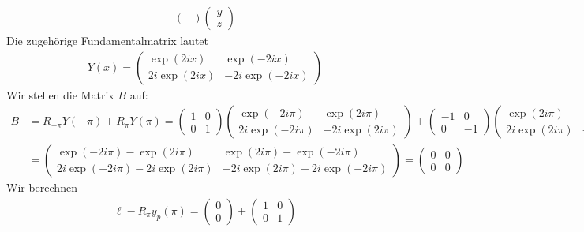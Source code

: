 \begin{solution}
\begin{enumerate}[label = \textbf{\alph*)}]
\begin{align*}
\begin{pmatrix}
    \end{pmatrix}
    \begin{pmatrix}
      y \\ z
    \end{pmatrix}
  \end{align*}
  Die zugehörige Fundamentalmatrix lautet
  \begin{align*}
    Y(x) = \begin{pmatrix}
      \exp(2ix) & \exp(-2ix) \\ 2i\exp(2ix) & -2i\exp(-2ix)
    \end{pmatrix}
  \end{align*}
  Wir stellen die Matrix $B$ auf:
  \begin{align*}
    B &= R_{-\pi}Y(-\pi) + R_{\pi}Y(\pi) =
    \begin{pmatrix}
      1 & 0 \\ 0 & 1
    \end{pmatrix}
    \begin{pmatrix}
      \exp(-2i\pi) & \exp(2i\pi) \\ 2i\exp(-2i\pi) & -2i\exp(2i\pi)
    \end{pmatrix} +
    \begin{pmatrix}
      -1 & 0 \\ 0 & -1
    \end{pmatrix}
    \begin{pmatrix}
      \exp(2i\pi) & \exp(-2i\pi) \\ 2i\exp(2i\pi) & -2i\exp(-2i\pi)
    \end{pmatrix} \\
    &= \begin{pmatrix}
      \exp(-2i\pi) - \exp(2i\pi) & \exp(2i\pi) - \exp(-2i\pi) \\
      2i\exp(-2i\pi) - 2i\exp(2i\pi) & -2i\exp(2i\pi) + 2i\exp(-2i\pi)
    \end{pmatrix}
    = \begin{pmatrix}
      0 & 0 \\
      0 & 0
    \end{pmatrix}
  \end{align*}
  Wir berechnen
  \begin{align*}
    \ell - R_{\pi}y_p(\pi) = \begin{pmatrix}
      0 \\ 0
    \end{pmatrix} +
    \begin{pmatrix}
      1 & 0 \\ 0 & 1
    \end{pmatrix}

\end{align*}
\end{enumerate}
\end{solution}
